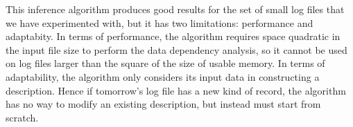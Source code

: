 This inference algorithm produces good results for the set of small
log files that we have experimented with, but it has two limitations:
performance and adaptabity.  In terms of performance, the algorithm
requires space quadratic in the input file size to perform the data
dependency analysis, so it cannot be used on log files larger than the
square of the size of usable memory.  In terms of adaptability, the
algorithm only considers its input data in constructing a description.
Hence if tomorrow's log file has a new kind of record, the algorithm
has no way to modify an existing description, but instead must start
from scratch.


%
%
%
%
